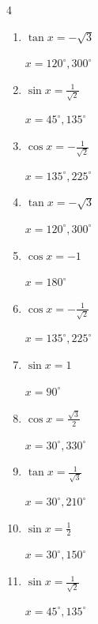 \begin{multicols}{4}
\begin{enumerate}
        $\displaystyle x = 0^{\circ} , 180^{\circ}$

  \item $\displaystyle \tan{x}  = -\sqrt{3}$

        $\displaystyle x = 120^{\circ} , 300^{\circ}$

  \item $\displaystyle \sin{x}  = \frac{1}{\sqrt{2}}$

        $\displaystyle x = 45^{\circ} , 135^{\circ}$

  \item $\displaystyle \cos{x}  = -\frac{1}{\sqrt{2}}$

        $\displaystyle x = 135^{\circ} , 225^{\circ}$

  \item $\displaystyle \tan{x}  = -\sqrt{3}$

        $\displaystyle x = 120^{\circ} , 300^{\circ}$

  \item $\displaystyle \cos{x}  = -1$

        $\displaystyle x = 180^{\circ}$

\columnbreak %

\resetques

  \item $\displaystyle \cos{x}  = -\frac{1}{\sqrt{2}}$

        $\displaystyle x = 135^{\circ} , 225^{\circ}$

  \item $\displaystyle \sin{x}  = 1$

        $\displaystyle x = 90^{\circ}$

  \item $\displaystyle \cos{x}  = \frac{\sqrt{3}}{2}$

        $\displaystyle x = 30^{\circ} , 330^{\circ}$

  \item $\displaystyle \tan{x}  = \frac{1}{\sqrt{3}}$

        $\displaystyle x = 30^{\circ} , 210^{\circ}$

  \item $\displaystyle \sin{x}  = \frac{1}{2}$

        $\displaystyle x = 30^{\circ} , 150^{\circ}$

  \item $\displaystyle \sin{x}  = \frac{1}{\sqrt{2}}$

        $\displaystyle x = 45^{\circ} , 135^{\circ}$


\end{enumerate}
\end{multicols}
